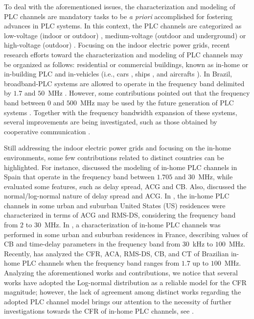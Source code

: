 \documentclass[journal]{IEEEtran}
\begin{document}
To deal with the aforementioned issues, the characterization and modeling of \ac{PLC} channels are mandatory tasks to be \textit{a priori} accomplished for fostering advances in \ac{PLC} systems. In this context, the \ac{PLC} channels are categorized as low-voltage (indoor or outdoor) \cite{Zhai:low}, medium-voltage (outdoor and underground) \cite{Lazaropoulos} or high-voltage (outdoor) \cite{Zajc}. Focusing on the indoor electric power grids, recent research efforts toward the characterization and modeling of \ac{PLC} channels may be organized as follows: residential or commercial buildings, known as in-home or in-building \ac{PLC} \cite{Amirshahi:PLC,Tlich:Indoor} and in-vehicles (i.e., cars \cite{Vallejo:Vehicle_PLC}, ships \cite{Barmada:Ships_PLC}, and aircrafts \cite{Jones:Aircraft_PLC,Andrey2016}). In Brazil, broadband-\ac{PLC}
systems are allowed to operate in the frequency band delimited by $1.7$ and $50$~MHz \cite{Anatel:PLC}. However, some contributions pointed out that the frequency band between $0$ and $500$~MHz may be used by the future generation of \ac{PLC} systems \cite{Luis:doc,zeddam1}. Together with the frequency bandwidth expansion of these systems, several improvements are being investigated, such as those obtained by cooperative communication \cite{mateus:2018,Michelle2016,Valencia2014,Roberto2015}.

Still addressing the indoor electric power grids and focusing on the in-home environments, some few contributions related to distinct countries can be highlighted. For instance, \cite{Canete:Model} discussed the modeling of in-home \ac{PLC} channels in Spain that operate in the frequency band between $1.705$ and $30$~MHz, while \cite{Canete:PLC} evaluated some features, such as delay spread, \ac{ACG} and \ac{CB}. Also, \cite{Cortes:PLC} discussed the normal/log-normal nature of delay spread and \ac{ACG}. In \cite{GalliUS,Galli:Wireline}, the in-home \ac{PLC} channels in some urban and suburban United States (US) residences were characterized in terms of \ac{ACG} and \ac{RMS-DS}, considering the frequency band from $2$ to $30$~MHz. In \cite{Tlich:Indoor}, a characterization of in-home \ac{PLC} channels was performed in some urban and suburban residences in France, describing values of \ac{CB} and time-delay parameters in the frequency band from $30$~kHz to $100$~MHz. Recently, \cite{Thiago:Characterization} has analyzed the \ac{CFR}, \ac{ACA}, \ac{RMS-DS}, \ac{CB}, and \ac{CT} of Brazilian in-home \ac{PLC} channels when the frequency band ranges from $1.7$ up to $100$~MHz. Analyzing the aforementioned works and contributions, we notice that several works have adopted the Log-normal distribution as a reliable model for the \ac{CFR} magnitude; however, the lack of agreement among distinct works regarding the adopted PLC channel model brings our attention to the necessity of further investigations towards the \ac{CFR} of in-home \ac{PLC} channels, see \cite{Cortes:PLC}. 
\end{document}
